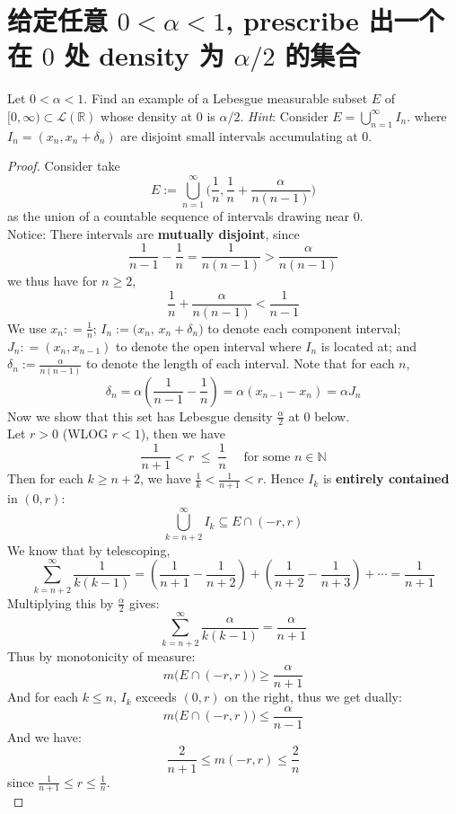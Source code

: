 \documentclass[lang=cn,11pt]{elegantbook}
\begin{document}
\section{给定任意 $0<\alpha <1$, prescribe 出一个在 $0$ 处 density 为 $\alpha/2$ 的集合}
  Let $0<\alpha <1$.
    Find an example of a Lebesgue measurable subset $E$ of $[0,\infty)\subset  \mathcal{L}(\mathbb{R})$ whose density at $0$ is $\alpha/2$. 
    \textit{Hint}: Consider $E=\bigcup_{n=1}^\infty I_n$. where $I_n=(x_n,x_n+\delta_n)$ are disjoint small intervals accumulating at $0$.
\begin{proof}
Consider take \[
E := \bigcup_{n=1}^{\infty}
\bigr( \frac{1}{n},
 \frac{1}{n}+ \frac{\alpha}{n(n-1)}\bigr)
\] as the union of a countable sequence of intervals drawing near $0$. \\
Notice: There intervals are \textbf{mutually disjoint}, since \[
\frac{1}{n-1} - \frac{1}{n}  =\frac{1}{n(n-1)}  > \frac{\alpha}{n(n-1)} 
\]
we thus have for $n \geq 2$, \[
\frac{1}{n} +
 \frac{\alpha}{n(n-1)} < \frac{1}{n-1}
\]
We use $x_n: = \frac{1}{n}$; $I_n := \bigl(x_{n},\,x_{n} + \delta_{n}\bigr)$ to denote each component interval; $J_n: = (x_n, x_{n-1})$ to denote the open interval where $I_n $ is located at; and $\delta_n := \frac{\alpha}{n(n-1)}$ to denote the length of each interval. Note that for each $n$, \[
\delta_n = \alpha (\frac{1}{n-1} - \frac{1}{n})  = \alpha(x_{n-1} - x_n)  = \alpha J_n
\]
Now we show that this set has Lebesgue density $\frac{\alpha}{2}$ at $0$ below.\\
Let $r>0$ (WLOG $r<1$), then we have  \[
     \frac{1}{n+1} < r \;\le\; \frac{1}{n} \quad \text{ for some } n \in \mathbb{N}
   \]
Then for each \(k \ge n+2\), we have \(\frac{1}{k} < \frac{1}{n+1} < r\). Hence $I_k$ is \textbf{entirely contained} in \((0,r)\):
\[ \bigcup_{k=n+2}^\infty I_k   \subseteq E \cap (-r,r) \]
We know that by telescoping,    \[
     \sum_{k = n+2}^\infty \frac{1}{k(k-1)} =
     \left(\frac{1}{n+1} - \frac{1}{n+2}\right)
     + \left(\frac{1}{n+2} - \frac{1}{n+3}\right)
     + \cdots = 
     \frac{1}{n+1}
   \]
Multiplying this by \(\tfrac{\alpha}{2}\) gives: \[
     \sum_{k = n+2}^\infty \frac{\alpha}{k(k-1)} = 
     \frac{\alpha}{n+1}
   \]
Thus by monotonicity of measure: \[
  m\bigl(E \cap (-r,r)\bigr) \geq   \frac{\alpha}{n+1}
\]
And for each $k \leq n$, $I_k$ exceeds $(0,r)$ on the right, thus we get dually: \[
  m\bigl(E \cap (-r,r)\bigr) \leq   \frac{\alpha}{n-1}
\] And we have: \[
\frac{2}{n+1} \leq m(-r,r) \leq \frac{2}{n}
\]since $\frac{1}{n+1}\leq r \leq \frac{1}{n}$.\\

\end{proof}
\end{document}
